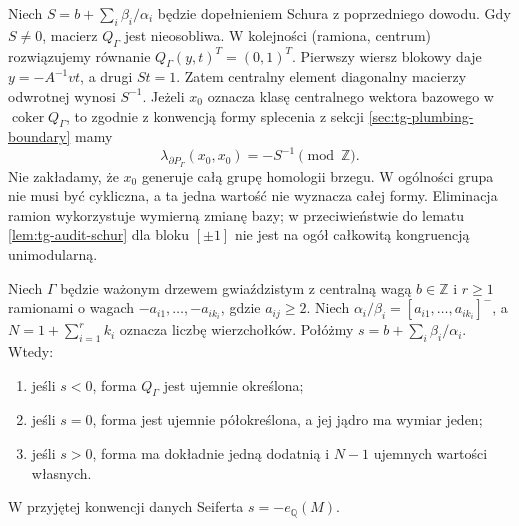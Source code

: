 \begin{uwaga}
Niech $S=b+\sum_i\beta_i/\alpha_i$ będzie dopełnieniem
Schura z poprzedniego dowodu. Gdy $S\ne0$, macierz
$Q_\Gamma$ jest nieosobliwa. W kolejności (ramiona, centrum)
rozwiązujemy równanie
$Q_\Gamma(y,t)^T=(0,1)^T$. Pierwszy wiersz blokowy
daje $y=-A^{-1}vt$, a drugi $St=1$.
Zatem centralny element diagonalny macierzy odwrotnej
wynosi $S^{-1}$. Jeżeli $x_0$ oznacza klasę centralnego
wektora bazowego w $\operatorname{coker}Q_\Gamma$,
to zgodnie z konwencją formy splecenia z sekcji
\ref{sec:tg-plumbing-boundary} mamy
\[
\lambda_{\partial P_\Gamma}(x_0,x_0)
=-S^{-1}\pmod{\mathbb Z}.
\]
Nie zakładamy, że $x_0$ generuje całą grupę homologii
brzegu. W ogólności grupa nie musi być cykliczna,
a ta jedna wartość nie wyznacza całej formy.
Eliminacja ramion wykorzystuje wymierną zmianę bazy;
w przeciwieństwie do lematu \ref{lem:tg-audit-schur}
dla bloku $[\pm1]$ nie jest na ogół całkowitą
kongruencją unimodularną.
\end{uwaga}

\begin{stwierdzenie}
\label{st:tg-star-definiteness}
Niech $\Gamma$ będzie ważonym drzewem gwiaździstym
z centralną wagą $b\in\mathbb Z$
i $r\ge1$ ramionami o wagach
$-a_{i1},\ldots,-a_{ik_i}$, gdzie
$a_{ij}\ge2$. Niech
$\alpha_i/\beta_i=[a_{i1},\ldots,a_{ik_i}]^-$,
a $N=1+\sum_{i=1}^rk_i$ oznacza
liczbę wierzchołków.
Połóżmy
$s=b+\sum_i\beta_i/\alpha_i$.
Wtedy:
\begin{enumerate}[label=(\roman*)]
\item jeśli $s<0$, forma $Q_\Gamma$
jest ujemnie określona;
\item jeśli $s=0$, forma jest ujemnie półokreślona,
a jej jądro ma wymiar jeden;
\item jeśli $s>0$, forma ma dokładnie
jedną dodatnią i $N-1$ ujemnych
wartości własnych.
\end{enumerate}
W przyjętej konwencji danych Seiferta
$s=-e_{\mathbb Q}(M)$.
\end{stwierdzenie}

